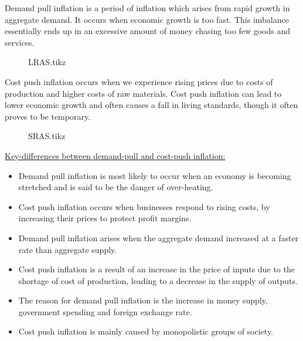 \documentclass[12pt]{article}
\begin{document}
\begin{soln}
	Demand pull inflation is a period of inflation which arises from rapid growth in aggregate demand. It occurs when economic growth is too fast. This imbalance essentially ends up in an excessive amount of money chasing too few goods and services.
	\begin{figure}[H]
		\centering
		{LRAS.tikz}
	\end{figure}
	Cost push inflation occurs when we experience rising prices due to costs of production and higher costs of raw materials. Cost push inflation can lead to lower economic growth and often causes a fall in living standards, though it often proves to be temporary.
	\begin{figure}[H]
		\centering
		{SRAS.tikz}
	\end{figure}
	\underline{Key-differences between demand-pull and cost-push inflation:}
	\begin{itemize}
		\item Demand pull inflation is most likely to occur when an economy is becoming stretched and is said to be the danger of over-heating.
		\item Cost push inflation occurs when businesses respond to rising costs, by increasing their prices to protect profit margins.
		\item Demand pull inflation arises when the aggregate demand increased at a faster rate than aggregate supply.
		\item Cost push inflation is a result of an increase in the price of inputs due to the shortage of cost of production, leading to a decrease in the supply of outputs.
		\item The reason for demand pull inflation is the increase in money supply, government spending and foreign exchange rate.
		\item Cost push inflation is mainly caused by monopolistic groups of society.
	\end{itemize}
\end{soln}
\newpage
\end{document}
